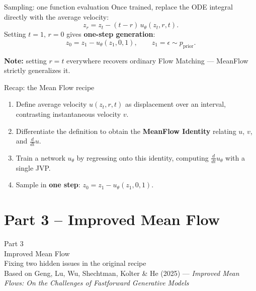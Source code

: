 \documentclass{beamer}
\begin{document}
\begin{frame}{Sampling: one function evaluation}
Once trained, replace the ODE integral directly with the average velocity:
\[
z_r = z_t - (t-r)\, u_\theta(z_t,r,t).
\]
Setting $t=1,\, r=0$ gives \textbf{one-step generation}:
\[
z_0 = z_1 - u_\theta(z_1, 0, 1), \qquad z_1 = \epsilon \sim p_{\text{prior}}.
\]
\begin{center}
\end{center}
\textbf{Note:} setting $r=t$ everywhere recovers ordinary Flow Matching --- MeanFlow strictly generalizes it.
\end{frame}

\begin{frame}{Recap: the Mean Flow recipe}
\begin{enumerate}
\item Define average velocity $u(z_t,r,t)$ as displacement over an interval, contrasting instantaneous velocity $v$.
\item Differentiate the definition to obtain the \textbf{MeanFlow Identity} relating $u$, $v$, and $\frac{d}{dt}u$.
\item Train a network $u_\theta$ by regressing onto this identity, computing $\frac{d}{dt}u_\theta$ with a single JVP.
\item Sample in \textbf{one step}: $z_0 = z_1 - u_\theta(z_1,0,1)$.
\end{enumerate}
\end{frame}


\section{Part 3 -- Improved Mean Flow}

\begin{frame}
\centering
{\Huge Part 3}\\[0.5em]
{\LARGE Improved Mean Flow}\\[1.5em]
\normalsize Fixing two hidden issues in the original recipe\\[0.3em]
Based on Geng, Lu, Wu, Shechtman, Kolter \& He (2025) --- \textit{Improved Mean Flows: On the Challenges of Fastforward Generative Models}
\end{frame}
\end{document}
